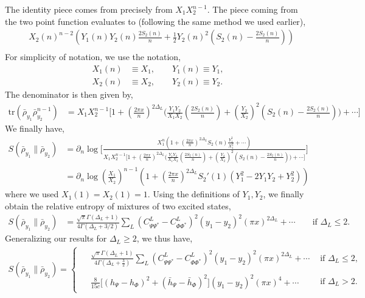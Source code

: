 \documentclass[11pt]{article}
\newcommand{\p}{\partial}
\newcommand{\lb}{\left(}
\newcommand{\rb}{\right)}
\begin{document}
The identity piece comes from precisely from $X_1 X_2^{n-1}$. The piece coming from the two point function evaluates to (following the same method we used earlier),
\begin{align}
    &X_2(n)^{n-2}\lb Y_1(n)Y_2 (n)\frac{2S_2(n)}{n} + \frac{1}{2}Y_2(n)^2 \lb S_2(n) - \frac{2S_2(n)}{n}\rb \rb \\
\end{align}
For simplicity of notation, we use the notation,
\begin{align}
    X_1(n) &\equiv X_1 ,\qquad Y_1(n) \equiv Y_1 ,\\
    X_2(n)&\equiv X_2, \qquad Y_2(n) \equiv Y_2.
\end{align}
The denominator is then given by,
\begin{align}
    \text{tr}\lb \bar{\rho}_{y_1}\bar{\rho}_{y_2}^{n-1}  \rb &= X_1 X_2^{n-1} \Bigg[ 1+  \lb\frac{2\pi x}{n}\rb^{2\Delta_L} \Bigg(\frac{Y_1Y_2}{X_1X_2}\lb\frac{2S_2(n)}{n}\rb  + \lb\frac{Y_2}{X_2}\rb^2 \lb S_2(n)-\frac{2S_2(n)}{n}\rb\Bigg)+\cdots\Bigg]
\end{align}
We finally have,
\begin{align}
    S(\bar{\rho}_{y_1} \| \bar{\rho}_{y_2} ) &= \p_n \log \Bigg[ \frac{X_1^n\lb1 + \lb\frac{2\pi x}{n}\rb^{2\Delta_L} S_2(n) \frac{Y_1^2}{X_1^2} + \cdots \rb}{X_1 X_2^{n-1} \Bigg[ 1+  \lb\frac{2\pi x}{n}\rb^{2\Delta_L} \Bigg(\frac{Y_1Y_2}{X_1X_2}\lb\frac{2S_2(n)}{n}\rb + \lb\frac{Y_2}{X_2}\rb^2 \lb S_2(n)-\frac{2S_2(n)}{n}\rb\Bigg)+\cdots\Bigg]}\Bigg] \\
    &= \p_n \log \lb \frac{X_1}{X_2}\rb^{n-1} \lb 1+ \lb\frac{2\pi x}{n}\rb^{2\Delta_L} S_2'(1) \lb Y_1^2 -2Y_1Y_2 +Y_2^2\rb\rb
\end{align}
where we used $X_1(1) = X_2(1)= 1$. Using the definitions of $Y_1,Y_2$, we finally obtain the relative entropy of mixtures of two excited states,
\begin{align}
    S(\bar{\rho}_{y_1} \| \bar{\rho}_{y_2} ) &= \frac{\sqrt{\pi} \Gamma(\Delta_L + 1)}{4\Gamma(\Delta_L + 3/2)}\sum_L (C_{\Psi \Psi^*}^L - C_{\Phi \Phi^*}^L)^2(y_1-y_2)^2 (\pi x)^{2\Delta_L} + \cdots \qquad \text{if }\Delta_L \leq 2.
\end{align}
Generalizing our results for $\Delta_L \geq 2$, we thus have,
\begin{align}\label{smallxMixture_wrt_mixture}
\boxed{
S(\bar{\rho}_{y_1} \| \bar{\rho}_{y_2} )
=
\begin{cases}
\begin{aligned}
&\frac{\sqrt{\pi}\Gamma(\Delta_L+1)}
{4\Gamma(\Delta_L+\frac32)}
\sum_L
(C^L_{\Psi\Psi^*}-C^L_{\Phi\Phi^*})^2
(y_1-y_2)^2(\pi x)^{2\Delta_L}
+\cdots
\end{aligned}
&
\text{if }\Delta_L\le 2,
\\[2ex]
\begin{aligned}
&\frac{8}{15c}
\Big[
(h_\Psi-h_\Phi)^2 
+(\bar h_\Psi-\bar h_\Phi)^2
\Big]
(y_1-y_2)^2(\pi x)^4
+\cdots
\end{aligned}
&
\text{if }\Delta_L>2 .
\end{cases}
}
\end{align}
\end{document}
